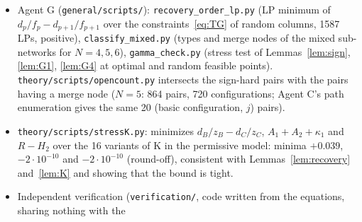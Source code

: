 \documentclass[11pt,a4paper]{report}
\newcommand{\VFTC}{V_{\mathrm{FTC}}}
\begin{document}
\begin{itemize}
and over all 6128 configurations at the eight test points of~\autocite{TGAT} for $N=5$ (minimum $=\VFTC$ to
$10^{-10}$ relative, the FTC attaining it); adversarial joint minimization over $(\alpha,z,q)$ and the operating point
(ratio never below 1 beyond $10^{-6}$), and targeted minimization on the permissive ``bad paths'' (family K; the
all-coupled variants of the 48 five-component families; 181 of the merge cases), never below 1; SCIP global
optimization used only as a cross-check at two points for $N=4$ (strict model, all 152 configurations, at
$\alpha=(8,4,2,1)$, $z_p=1/4$, $q=1$: SCIP and ipopt agree to $2.2\cdot10^{-9}$, and the SCIP dual bound is $\ge\VFTC$
for every non-tying configuration, while for the tying ones it reached $\VFTC(1-8\cdot10^{-6})$ at the time limit;
permissive model, first 100 configurations, at the point of the example below: agreement to $3.7\cdot10^{-9}$). Many
exact ties (for $N=4$, $q=1$, 12 to 16 configurations tie with the FTC, depending on the dominant peak; 2717 of 2720
observed ties satisfy Corollary~\ref{cor:tie}). Random searches with $q\ne1$ and a random permissive search for $N=5$
were not run. The FTC value reproduces the eight five-component optima of~\autocite{TGAT} (all eight test points have
an extreme highest peak, $j=1$ or $j=4$, so they are covered by Theorem~\ref{thm:extreme} in both models), and the
model reproduces Halvorsen's ternary table~\autocite{HalvorsenThesis} (Table~6.1). Scripts and data:
\texttt{computation/scripts/} and \texttt{computation/certificates/}.
\item Agent G (\texttt{general/scripts/}): \texttt{recovery\_order\_lp.py} (LP minimum of $d_p/f_p-d_{p+1}/f_{p+1}$
over the constraints~\eqref{eq:TG} of random columns, 1587 LPs, positive), \texttt{classify\_mixed.py} (types and merge
nodes of the mixed sub-networks for $N=4,5,6$), \texttt{gamma\_check.py} (stress test of Lemmas~\ref{lem:sign},
\ref{lem:G1}, \ref{lem:G4} at optimal and random feasible points). \texttt{theory/scripts/opencount.py} intersects the
sign-hard pairs with the pairs having a merge node ($N=5$: 864 pairs, 720 configurations; Agent C's path enumeration
gives the same 20 (basic configuration, $j$) pairs).
\item \texttt{theory/scripts/stressK.py}: minimizes $d_B/z_B-d_C/z_C$, $A_1+A_2+\kappa_1$ and $R-H_2$ over the 16 variants
of K in the permissive model: minima $+0.039$, $-2\cdot10^{-10}$ and $-2\cdot10^{-10}$ (round-off), consistent with
Lemmas~\ref{lem:recovery} and~\ref{lem:K} and showing that the bound is tight.
\item Independent verification (\texttt{verification/}, code written from the equations, sharing nothing with the

\end{itemize}
\end{document}
